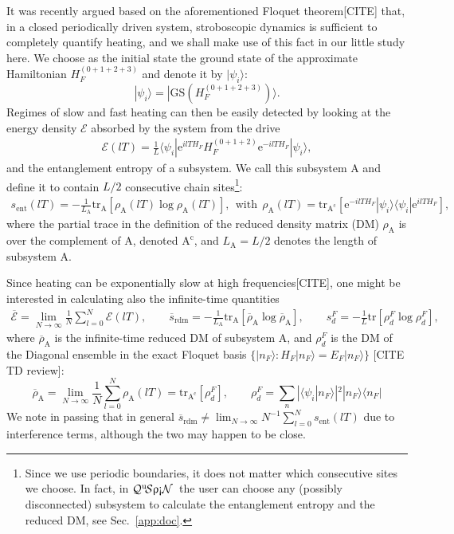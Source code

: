 \documentclass{SciPost}
\newcommand\0{\scalebox{-1}[1]{0}}
\newcommand{\qspin}{$\mathcal{Q}^{\mathrm{u}}\!\mathcal{S}\uprho\mathrm{\text{\textexclamdown}}\mathcal{N}$}
\begin{document}
It was recently argued based on the aforementioned Floquet theorem[CITE] that, in a closed periodically driven system, stroboscopic dynamics is sufficient to completely quantify heating, and we shall make use of this fact in our little study here. We choose as the initial state the ground state of the approximate Hamiltonian $H_F^{(0+1+2+3)}$ and denote it by $|\psi_i\rangle$:
\begin{equation}
|\psi_i\rangle = |\mathrm{GS}(H_F^{(0+1+2+3)})\rangle.
\end{equation}
Regimes of slow and fast heating can then be easily detected by looking at the energy density $\mathcal{E}$ absorbed by the system from the drive
\begin{eqnarray}
\mathcal{E}(lT) = \frac{1}{L}\langle\psi_i|\mathrm e^{ilT H_F}H_F^{(0+1+2)}\mathrm e^{-ilT H_F}|\psi_i\rangle, 
\label{eq:Floquet_E}
\end{eqnarray}
and the entanglement entropy of a subsystem. We call this subsystem A and define it to contain $L/2$ consecutive chain sites\footnote{Since we use periodic boundaries, it does not matter which consecutive sites we choose. In fact, in \qspin\ the user can choose any (possibly disconnected) subsystem to calculate the entanglement entropy and the reduced DM, see Sec.~\ref{app:doc}.}:
\begin{eqnarray}
s_\mathrm{ent}(lT) = -\frac{1}{L_\mathrm{A}}\mathrm{tr}_\mathrm{A}\left[ \rho_\mathrm{A}(lT)\log\rho_\mathrm{A}(lT) \right], \ \ \mathrm{with}\ \ \rho_\mathrm{A}(lT) = \mathrm{tr}_\mathrm{A^c}\left[ \mathrm e^{-ilT H_F}|\psi_i\rangle\langle\psi_i|\mathrm e^{ilT H_F}\right],
\label{eq:Floquet_S}
\end{eqnarray}
where the partial trace in the definition of the reduced density matrix (DM) $\rho_\mathrm{A}$ is over the complement of A, denoted $\mathrm{A^c}$, and $L_\mathrm{A}=L/2$ denotes the length of subsystem A.

Since heating can be exponentially slow at high frequencies[CITE], one might be interested in calculating also the infinite-time quantities
\begin{eqnarray}
\overline{\mathcal{E}} = \lim_{N\to\infty}\frac{1}{N}\sum_{l=0}^{N}\mathcal{E}(lT), \qquad
\overline{s}_\mathrm{rdm} = -\frac{1}{L_\mathrm{A}}\mathrm{tr}_\mathrm{A}\left[ \overline{\rho}_\mathrm{A}\log\overline{\rho}_\mathrm{A} \right], \qquad
s_d^F = -\frac{1}{L}\mathrm{tr} \left[ \rho^F_d\log\rho^F_d \right], 
\end{eqnarray}   
where $\overline{\rho}_\mathrm{A}$ is the infinite-time reduced DM of subsystem A, and $\rho^F_d$ is the DM of the Diagonal ensemble in the exact Floquet basis $\{ |n_F\rangle\!\!: H_F|n_F\rangle=E_F|n_F\rangle \}$ [CITE TD review]:
\begin{equation*}
\overline{\rho}_\mathrm{A} = \lim_{N\to\infty}\frac{1}{N}\sum_{l=0}^{N}\rho_\mathrm{A}(lT)= \mathrm{tr}_\mathrm{A^c}\left[\rho_d^F\right], \qquad
\rho_d^F = \sum_{n} |\langle \psi_i|n_F\rangle |^2 |n_F\rangle\langle n_F|
\end{equation*}
We note in passing that in general $\overline{s}_\mathrm{rdm}\neq \lim_{N\to\infty}N^{-1}\sum_{l=0}^{N}s_\mathrm{ent}(lT)$ due to interference terms, although the two may happen to be close.
\end{document}
